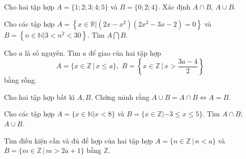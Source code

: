 \begin{bt}%
	Cho hai tập hợp $A=\{ 1;2;3;4;5\}$ và $B=\{ 0;2;4\}$. Xác định $A\cap B$, $A\cup B$.
\end{bt}

\begin{bt}%
	Cho các tập hợp  $A=\left\{x\in \mathbb{R}|(2x-x^2)(2x^2-3x-2)=0\right\}$ và $B=\left\{n\in \mathbb{N}|3<n^2<30\right\}$. Tìm $A\bigcap B$.
\end{bt}

\begin{bt}%
	Cho $a$ là số nguyên. Tìm  $a$ để  giao của hai tập hợp $$A=\{x\in\mathbb{Z}\,\big|\, x\le a\}, \,\, B=\left\{x\in\mathbb{Z}\,\big|\, x>\dfrac{3a-4}{2}\right\}$$
	bằng rỗng. 
\end{bt}

\begin{bt}%
	Cho hai tập hợp bất kì $A,B.$ Chứng minh rằng $A\cup B=A\cap B\Leftrightarrow A=B.$
\end{bt}

\begin{bt}%
	Cho các tập hợp $A=\{x\in\mathbb{N}|x<8\}$ và $B=\{x\in\mathbb{Z}| -3\leq x\leq 5\}$. Tìm $A\cap B$; $A\cup B$.
\end{bt}



\begin{bt}%
	Tìm điều kiện cần và đủ để hợp của hai tập hợp $A=\{n\in\mathbb{Z}\,| \, n<a \}$ và $B=\{m\in \mathbb{Z}\,|\, m> 2a+1 \}$ bằng $\mathbb{Z}$. 
\end{bt}


